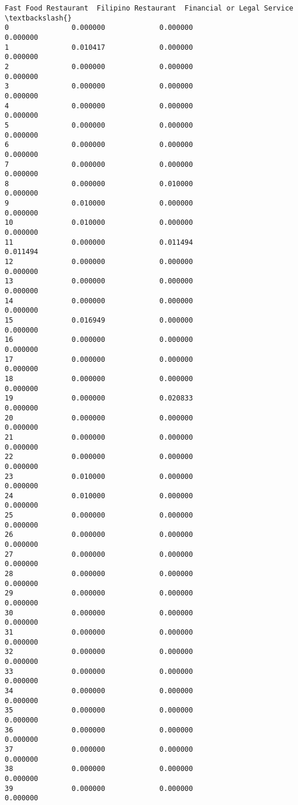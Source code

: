 \documentclass[11pt]{article}
\begin{document}
\begin{tcolorbox}[breakable, size=fbox, boxrule=.5pt, pad at break*=1mm, opacityfill=0]
\begin{Verbatim}[commandchars=\\\{\}]
    Fast Food Restaurant  Filipino Restaurant  Financial or Legal Service  \textbackslash{}
0               0.000000             0.000000                    0.000000
1               0.010417             0.000000                    0.000000
2               0.000000             0.000000                    0.000000
3               0.000000             0.000000                    0.000000
4               0.000000             0.000000                    0.000000
5               0.000000             0.000000                    0.000000
6               0.000000             0.000000                    0.000000
7               0.000000             0.000000                    0.000000
8               0.000000             0.010000                    0.000000
9               0.010000             0.000000                    0.000000
10              0.010000             0.000000                    0.000000
11              0.000000             0.011494                    0.011494
12              0.000000             0.000000                    0.000000
13              0.000000             0.000000                    0.000000
14              0.000000             0.000000                    0.000000
15              0.016949             0.000000                    0.000000
16              0.000000             0.000000                    0.000000
17              0.000000             0.000000                    0.000000
18              0.000000             0.000000                    0.000000
19              0.000000             0.020833                    0.000000
20              0.000000             0.000000                    0.000000
21              0.000000             0.000000                    0.000000
22              0.000000             0.000000                    0.000000
23              0.010000             0.000000                    0.000000
24              0.010000             0.000000                    0.000000
25              0.000000             0.000000                    0.000000
26              0.000000             0.000000                    0.000000
27              0.000000             0.000000                    0.000000
28              0.000000             0.000000                    0.000000
29              0.000000             0.000000                    0.000000
30              0.000000             0.000000                    0.000000
31              0.000000             0.000000                    0.000000
32              0.000000             0.000000                    0.000000
33              0.000000             0.000000                    0.000000
34              0.000000             0.000000                    0.000000
35              0.000000             0.000000                    0.000000
36              0.000000             0.000000                    0.000000
37              0.000000             0.000000                    0.000000
38              0.000000             0.000000                    0.000000
39              0.000000             0.000000                    0.000000


\end{Verbatim}
\end{tcolorbox}
\end{document}
